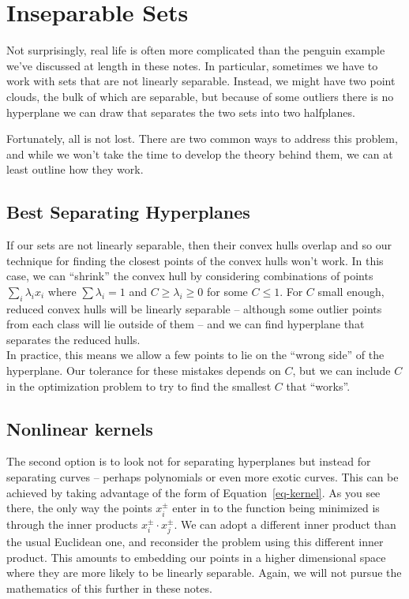 \documentclass[
  11pt,
  letterpaper,
]{scrbook}
\theoremstyle{plain}
\theoremstyle{remark}
\begin{document}
\hypertarget{inseparable-sets}{%
\section{Inseparable Sets}\label{inseparable-sets}}

Not surprisingly, real life is often more complicated than the penguin
example we've discussed at length in these notes. In particular,
sometimes we have to work with sets that are not linearly separable.
Instead, we might have two point clouds, the bulk of which are
separable, but because of some outliers there is no hyperplane we can
draw that separates the two sets into two halfplanes.

Fortunately, all is not lost. There are two common ways to address this
problem, and while we won't take the time to develop the theory behind
them, we can at least outline how they work.

\hypertarget{best-separating-hyperplanes}{%
\subsection{Best Separating
Hyperplanes}\label{best-separating-hyperplanes}}

If our sets are not linearly separable, then their convex hulls overlap
and so our technique for finding the closest points of the convex hulls
won't work. In this case, we can ``shrink'' the convex hull by
considering combinations of points \(\sum_{i}\lambda_{i}x_{i}\) where
\(\sum\lambda_{i}=1\) and \(C\ge\lambda_{i}\ge 0\) for some \(C\le 1\).
For \(C\) small enough, reduced convex hulls will be linearly separable
-- although some outlier points from each class will lie outside of them
-- and we can find hyperplane that separates the reduced hulls.\\
In practice, this means we allow a few points to lie on the ``wrong
side'' of the hyperplane. Our tolerance for these mistakes depends on
\(C\), but we can include \(C\) in the optimization problem to try to
find the smallest \(C\) that ``works''.

\hypertarget{nonlinear-kernels}{%
\subsection{Nonlinear kernels}\label{nonlinear-kernels}}

The second option is to look not for separating hyperplanes but instead
for separating curves -- perhaps polynomials or even more exotic curves.
This can be achieved by taking advantage of the form of
Equation~\ref{eq-kernel}. As you see there, the only way the points
\(x_{i}^{\pm}\) enter in to the function being minimized is through the
inner products \(x_{i}^{\pm}\cdot x_{j}^{\pm}\). We can adopt a
different inner product than the usual Euclidean one, and reconsider the
problem using this different inner product. This amounts to embedding
our points in a higher dimensional space where they are more likely to
be linearly separable. Again, we will not pursue the mathematics of this
further in these notes.
\end{document}
